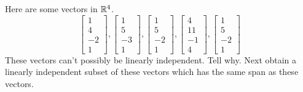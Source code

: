 \documentclass{ximera}
\begin{document}
\begin{problem}\label{prb:3.29} Here are some vectors in $\mathbb{R}^{4}$.
\begin{equation*}
\left[
\begin{array}{r}
1 \\
4 \\
-2 \\
1
\end{array}
\right] ,\left[
\begin{array}{r}
1 \\
5 \\
-3 \\
1
\end{array}
\right] ,\left[
\begin{array}{r}
1 \\
5 \\
-2 \\
1
\end{array}
\right] ,\left[
\begin{array}{r}
4 \\
11 \\
-1 \\
4
\end{array}
\right] ,\left[
\begin{array}{r}
1 \\
5 \\
-2 \\
1
\end{array}
\right]
\end{equation*}
These vectors can't possibly be linearly independent. Tell why. Next obtain a
linearly independent subset of these vectors which has the same span as
these vectors. 
\end{problem}
\end{document}
